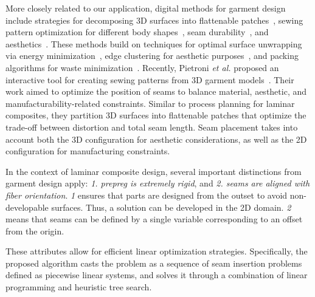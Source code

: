 More closely related to our application, digital methods 
for garment design include strategies for decomposing 3D surfaces into flattenable patches~\cite{wang2002surface, poranne2017autocuts}, sewing pattern optimization for different body shapes~\cite{wolff2023designing, meng2012flexible}, seam durability~\cite{montes2020computational}, and aesthetics~\cite{kwok2015styling}. These methods build on techniques for optimal surface unwrapping via energy minimization~\cite{poranne2017autocuts}, edge clustering for aesthetic purposes~\cite{bruno2009you}, and packing algorithms for waste minimization~\cite{nee1986designing}.
Recently, Pietroni \emph{et al.} proposed an interactive tool for creating sewing patterns from 3D garment models~\cite{pietroni2022computational}. Their work aimed to optimize the position of seams to balance material, aesthetic, and manufacturability-related constraints. Similar to process planning for laminar composites, they partition 3D surfaces into flattenable patches that optimize the trade-off between distortion and total seam length. Seam placement takes into account both the 3D configuration for aesthetic considerations, as well as the 2D configuration for manufacturing constraints.

In the context of laminar composite design, several important distinctions from garment design apply: \emph{1. prepreg is extremely rigid}, and \emph{2. seams are aligned with fiber orientation}. \emph{1} ensures that parts are designed from the outset to avoid non-developable surfaces. Thus, a solution can be developed in the 2D domain. \emph{2} means that seams can be defined by a single variable corresponding to an offset from the origin.

These attributes allow for efficient linear optimization strategies. Specifically, the proposed algorithm casts the problem as a sequence of seam insertion problems defined as piecewise linear systems, and solves it through a combination of linear programming and heuristic tree search.